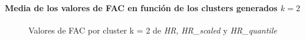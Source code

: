 \paragraph{Media de los valores de FAC en función de los clusters generados $k = 2$}

\begin{figure}[H]
    \centering
    \caption{Valores de FAC por cluster k = 2 de \textit{HR}, \textit{HR\_scaled} y \textit{HR\_quantile}}\label{fig:acf_cls_fc}
\end{figure}

